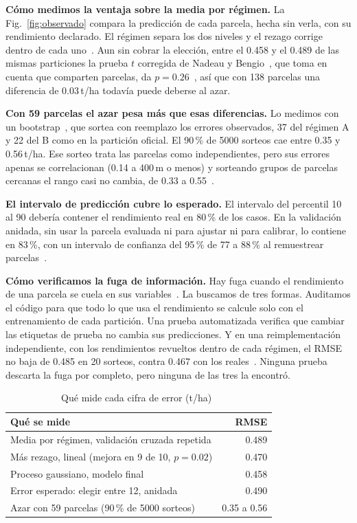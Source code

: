 \documentclass[conference,letterpaper]{IEEEtran}
\begin{document}
\textbf{Cómo medimos la ventaja sobre la media por régimen.} La Fig.~\ref{fig:observado} compara la predicción de
cada parcela, hecha sin verla, con su rendimiento declarado. El régimen separa los dos niveles y el rezago corrige
dentro de cada uno~\cite{doc_modelo}. Aun sin cobrar la elección, entre el 0.458 y el 0.489 de las mismas particiones
la prueba $t$ corregida de Nadeau y Bengio~\cite{nadeau2003}, que toma en cuenta que comparten parcelas, da
$p=0.26$~\cite{doc_modelo}, así que con 138 parcelas una diferencia de 0.03\,t/ha todavía puede deberse al azar.

\textbf{Con 59 parcelas el azar pesa más que esas diferencias.} Lo medimos con un bootstrap~\cite{efron1993}, que
sortea con reemplazo los errores observados, 37 del régimen A y 22 del B como en la partición oficial. El 90\,\% de
5000 sorteos cae entre 0.35 y 0.56\,t/ha. Ese sorteo trata las parcelas como independientes, pero sus errores apenas
se correlacionan (0.14 a 400\,m o menos) y sorteando grupos de parcelas cercanas el rango casi no cambia, de 0.33 a
0.55~\cite{doc_modelo}.

\textbf{El intervalo de predicción cubre lo esperado.} El intervalo del percentil 10 al 90 debería contener el
rendimiento real en 80\,\% de los casos. En la validación anidada, sin usar la parcela evaluada ni para ajustar ni
para calibrar, lo contiene en 83\,\%, con un intervalo de confianza del 95\,\% de 77 a 88\,\% al remuestrear
parcelas~\cite{doc_modelo}.

\textbf{Cómo verificamos la fuga de información.} Hay fuga cuando el rendimiento de una parcela se cuela en sus
variables~\cite{kaufman2012}. La buscamos de tres formas. Auditamos el código para que todo lo que usa el rendimiento
se calcule solo con el entrenamiento de cada partición. Una prueba automatizada verifica que cambiar las etiquetas de
prueba no cambia sus predicciones. Y en una reimplementación independiente, con los rendimientos revueltos dentro de
cada régimen, el RMSE no baja de 0.485 en 20 sorteos, contra 0.467 con los reales~\cite{doc_modelo}. Ninguna prueba descarta la fuga
por completo, pero ninguna de las tres la encontró.


\begin{table}[!t]
\centering
\caption{Qué mide cada cifra de error (t/ha)~\cite{doc_modelo}}
\label{tab:error}
\footnotesize
\begin{tabular}{@{}l@{}r@{}}
\toprule
Qué se mide & RMSE \\
\midrule
Media por régimen, validación cruzada repetida & 0.489 \\
Más rezago, lineal (mejora en 9 de 10, $p=0.02$) & 0.470 \\
Proceso gaussiano, modelo final & 0.458 \\
Error esperado: elegir entre 12, anidada & 0.490 \\
Azar con 59 parcelas (90\,\% de 5000 sorteos)\quad & 0.35 a 0.56 \\
\bottomrule
\end{tabular}
\end{table}
\end{document}
